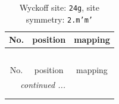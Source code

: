 \documentclass[fleqn,8pt]{jsarticle}
\begin{document}
\renewcommand{\arraystretch}{1.2}
\begin{longtable}{ccc}
\caption{Wyckoff site: {\tt 24g}, site symmetry: {\tt 2.m'm'}}
 \\
 \hline \hline
No. & position & mapping \\ \hline \endfirsthead

\multicolumn{2}{l}{\tablename\ \thetable{}} \\
 \hline \hline
No. & position & mapping \\ \hline \endhead

 \hline \hline
\multicolumn{2}{r}{\footnotesize\it continued ...} \\ \endfoot

 \hline \hline
\multicolumn{2}{r}{} \\ \endlastfoot


\end{longtable}
\end{document}
